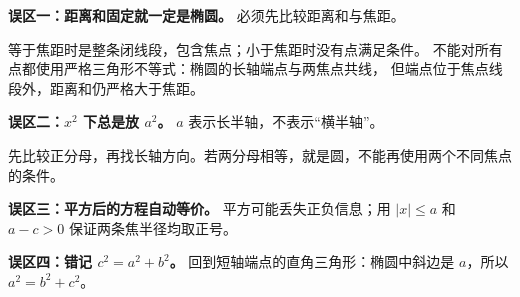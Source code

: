 \begin{trapbox}
\textbf{误区一：距离和固定就一定是椭圆。} 必须先比较距离和与焦距。

等于焦距时是整条闭线段，包含焦点；小于焦距时没有点满足条件。
不能对所有点都使用严格三角形不等式：椭圆的长轴端点与两焦点共线，
但端点位于焦点线段外，距离和仍严格大于焦距。
\end{trapbox}
\clearpage
\begin{trapbox}
\textbf{误区二：$x^2$ 下总是放 $a^2$。} $a$ 表示长半轴，不表示“横半轴”。

先比较正分母，再找长轴方向。若两分母相等，就是圆，不能再使用两个不同焦点的条件。

\textbf{误区三：平方后的方程自动等价。}
平方可能丢失正负信息；用 $|x|\le a$ 和 $a-c>0$ 保证两条焦半径均取正号。

\textbf{误区四：错记 $c^2=a^2+b^2$。}
回到短轴端点的直角三角形：椭圆中斜边是 $a$，所以 $a^2=b^2+c^2$。
\end{trapbox}
\clearpage
